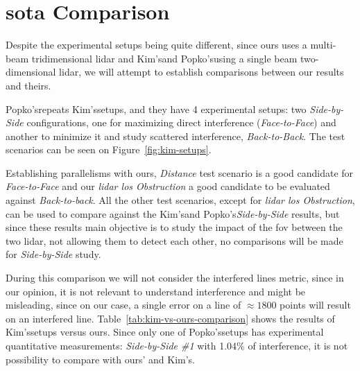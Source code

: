\section{\acl{sota} Comparison}
\label{sec:lidar-interference:sota-comparison}
Despite the experimental setups being quite different, since ours uses a multi-beam tridimensional \ac{lidar} and Kim's\etal and Popko's\etal using a single beam two-dimensional \ac{lidar}, we will attempt to establish comparisons between our results and theirs.

Popko's\etal repeats Kim's\etal setups, and they have 4 experimental setups: two \textit{Side-by-Side} configurations, one for maximizing direct interference (\textit{Face-to-Face}) and another to minimize it and study scattered interference, \textit{Back-to-Back}. The test scenarios can be seen on Figure~\ref{fig:kim-setups}. 

Establishing parallelisms with ours, \textit{Distance} test scenario is a good candidate for \textit{Face-to-Face} and our \textit{\ac{lidar} \ac{los} Obstruction} a  good candidate to be evaluated against \textit{Back-to-back}. All the other test scenarios, except for \textit{\ac{lidar} \ac{los} Obstruction}, can be used to compare against the Kim's\etal and Popko's\etal \textit{Side-by-Side} results, but since these results main objective is to study the impact of the \ac{fov} between the two \ac{lidar}, not allowing them to detect each other, no comparisons will be made for \textit{Side-by-Side} study.

During this comparison we will not consider the interfered lines metric, since in our opinion, it is not relevant to understand interference and might be misleading, since on our case, a single error on a line of $\approx 1800$ points will result on an interfered line. Table~\ref{tab:kim-vs-ours-comparison} shows the results of Kim's\etal setups versus ours. Since only one of Popko's\etal setups has experimental quantitative measurements: \textit{Side-by-Side \#1} with 1.04\% of interference, it is not possibility to compare with ours' and Kim's\etal.


